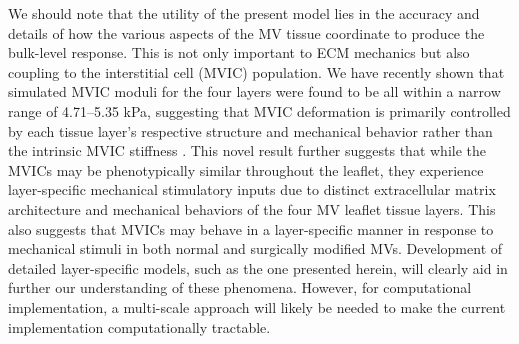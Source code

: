 We should note that the utility of the present model lies in the accuracy and details of how the various aspects of the MV tissue coordinate to produce the bulk-level response. This is not only important to ECM mechanics but also coupling to the interstitial cell (MVIC) population. We have recently shown that simulated MVIC moduli for the four layers were found to be all within a narrow range of 4.71–5.35 kPa, suggesting that MVIC deformation is primarily controlled by each tissue layer’s respective structure and mechanical behavior rather than the intrinsic MVIC stiffness \cite{lee_effects_2015}. This novel result further suggests that while the MVICs may be phenotypically similar throughout the leaflet, they experience layer-specific mechanical stimulatory inputs due to distinct extracellular matrix architecture and mechanical behaviors of the four MV leaflet tissue layers. This also suggests that MVICs may behave in a layer-specific manner in response to mechanical stimuli in both normal and surgically modified MVs. Development of detailed layer-specific models, such as the one presented herein, will clearly aid in further our understanding of these phenomena. However, for computational implementation, a multi-scale approach \cite{lee_mitral_2014} will likely be needed to make the current implementation computationally tractable.